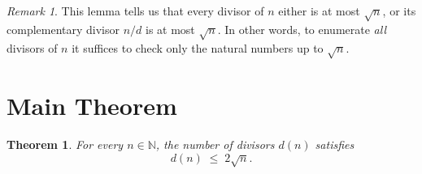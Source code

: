 \documentclass[12pt]{article}
\newtheorem{theorem}{Theorem}
\theoremstyle{remark}
\newtheorem*{remark}{Remark}
\begin{document}
\smallskip

\begin{remark}
This lemma tells us that every divisor of $n$ either is at most $\sqrt{n}$,
or its complementary divisor $n/d$ is at most $\sqrt{n}$.  In other words,
to enumerate \emph{all} divisors of $n$ it suffices to check only the
natural numbers up to $\sqrt{n}$.
\end{remark}

\section*{Main Theorem}

\begin{theorem}
For every $n \in \mathbb{N}$, the number of divisors $d(n)$ satisfies
\[
    d(n) \;\leq\; 2\sqrt{n}.
\]
\end{theorem}
\end{document}
